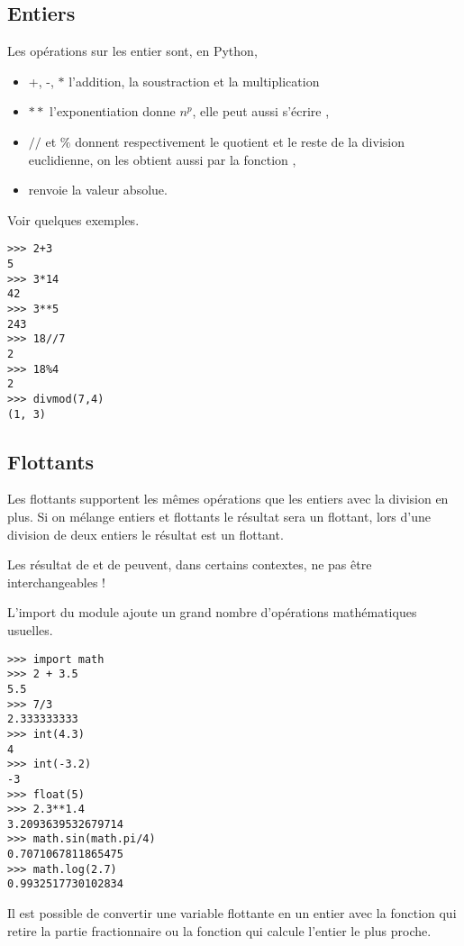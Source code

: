 \subsection{Entiers}
Les opérations sur les entier sont, en Python,
\begin{itemize}
\item +, -, $*$ l'addition, la soustraction et la multiplication

\item $**$ l'exponentiation  donne $n^p$, elle peut aussi s'écrire ,

\item $//$ et  $\%$ donnent respectivement le quotient et le reste de la division euclidienne, on les obtient aussi par la fonction ,

\item {} renvoie la valeur absolue.
\end{itemize}
Voir quelques exemples.
\begin{lstlisting}
>>> 2+3			
5
>>> 3*14
42
>>> 3**5
243
>>> 18//7
2
>>> 18%4
2
>>> divmod(7,4)      
(1, 3)
\end{lstlisting}
\subsection{Flottants}
Les flottants supportent les mêmes opérations que les entiers avec la division en plus. 
Si on mélange entiers et flottants le résultat sera un flottant, lors d'une division de deux entiers le résultat est un flottant.

Les résultat de  et de  peuvent, dans certains contextes, ne pas être interchangeables !

L'import du module  ajoute un grand nombre d'opérations mathématiques usuelles. 
\begin{lstlisting}
>>> import math
>>> 2 + 3.5
5.5
>>> 7/3
2.333333333
>>> int(4.3)
4
>>> int(-3.2)
-3
>>> float(5)
>>> 2.3**1.4
3.2093639532679714
>>> math.sin(math.pi/4)
0.7071067811865475
>>> math.log(2.7)
0.9932517730102834
\end{lstlisting}
Il est possible de convertir une variable flottante en un entier avec la fonction  qui retire la partie fractionnaire ou la fonction  qui calcule l'entier le plus proche. 


